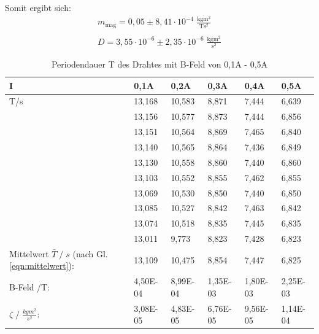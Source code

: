 Somit ergibt sich:
\begin{gather*}
    m_\text{mag} = 0,05 \pm 8,41 \cdot 10^{-4} \;\mathrm{\frac{kgm^2}{Ts^2}}\\\\
    D = 3,55\cdot10^{-6} \pm 2,35 \cdot 10^{-6} \;\mathrm{\frac{kgm^2}{s^2}}
\end{gather*}

\newpage
\begin{table}
    \caption{Periodendauer T des Drahtes mit B-Feld von 0,1A - 0,5A}
    \centering
    \begin{tabular}{p{3cm} | p{1.5cm} p{1.5cm} p{1.5cm} p{1.5cm} p{1.5cm}}
    I & 0,1A & 0,2A & 0,3A & 0,4A & 0,5A\\
    \midrule
    T\;/\;s & 13,168 & 10,583 & 8,871 &  7,444 &  6,639\\   
    & 13,156 & 10,577 & 8,873 &  7,444 &  6,856\\   
    & 13,151 & 10,564 & 8,869 &  7,465 &  6,840\\   
    & 13,140 & 10,565 & 8,864 &  7,436 &  6,849\\   
    & 13,130 & 10,558 & 8,860 &  7,440 &  6,860\\   
    & 13,103 & 10,552 & 8,855 &  7,462 &  6,855\\   
    & 13,069 & 10,530 & 8,850 &  7,440 &  6,850\\   
    & 13,085 & 10,527 & 8,842 &  7,463 &  6,842\\   
    & 13,074 & 10,518 & 8,835 &  7,445 &  6,835\\   
    & 13,011 &  9,773 & 8,823 &  7,428 &  6,823\\ 
    \midrule
    Mittelwert $\bar{T}\;/\;s$ (nach Gl. \ref{eqn:mittelwert}):    & 13,109 & 10,475 & 8,854 & 7,447 & 6,825 \\
    \midrule
    B-Feld \;/\;T: & 4,50E-04 & 8,99E-04 & 1,35E-03 & 1,80E-03 & 2,25E-03\\
    $\zeta\;/\;\frac{kgm^2}{s^2}$: & 3,08E-05 & 4,83E-05 & 6,76E-05 & 9,56E-05 & 1,14E-04\\
    \bottomrule
    \end{tabular}
    \label{tab:tabelle_01A}
\end{table}



